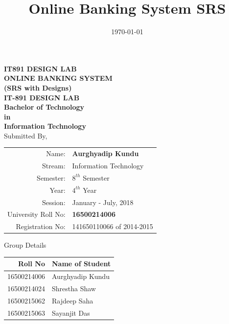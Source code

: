 \documentclass[11pt, a4paper]{thesis}
\date{\today}
\title{Online Banking System SRS}
\begin{document}
\begin{titlepage}

\begin{center}

\textup{\small {\bf IT891 DESIGN LAB}}\\[0.2in]

\Large \textbf {ONLINE BANKING SYSTEM \\ (SRS with Designs)}\\[0.5in]
       {\large \bf{IT-891 DESIGN LAB}}\\[0.1in]
       {\bf Bachelor of Technology \\in\\ Information Technology}\\[0.5in]

Submitted By,\\
\begin{table}[h]
\centering
\begin{tabular}{| r | l |}
\hline
Name: & \textbf{Aurghyadip Kundu}\\
Stream: & Information Technology\\ 
Semester: & $8^{th}$ Semester\\
Year: & $4^{th}$ Year\\
Session: & January - July, 2018\\
University Roll No: & \textbf{16500214006}\\
Registration No: & 141650110066 of 2014-2015\\ \hline
\end{tabular}
\end{table}
\normalsize Group Details\\
\begin{table}[h]
\centering
\begin{tabular}{| r | l |}
\hline
\textbf{Roll No} & \textbf{Name of Student} \\ \hline
16500214006 & Aurghyadip Kundu \\
16500214024 & Shrestha Shaw \\ 
16500215062 & Rajdeep Saha \\
16500215063 & Sayanjit Das\\ \hline
\end{tabular}
\end{table}
\vspace{.1in}
\vfill


\end{center}
\end{titlepage}
\end{document}
